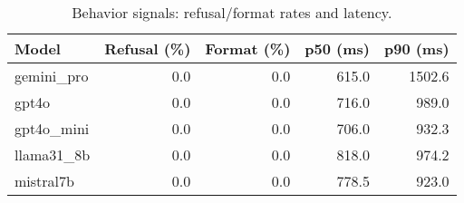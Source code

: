 \begin{table}[t]\centering
\caption{Behavior signals: refusal/format rates and latency.}
\label{tab:behavior}
\begin{tabular}{lrrrr}
\toprule
Model & Refusal (\%) & Format (\%) & p50 (ms) & p90 (ms) \\
\midrule
gemini_pro & 0.0 & 0.0 & 615.0 & 1502.6 \\
gpt4o & 0.0 & 0.0 & 716.0 & 989.0 \\
gpt4o_mini & 0.0 & 0.0 & 706.0 & 932.3 \\
llama31_8b & 0.0 & 0.0 & 818.0 & 974.2 \\
mistral7b & 0.0 & 0.0 & 778.5 & 923.0 \\
\bottomrule
\end{tabular}
\end{table}
